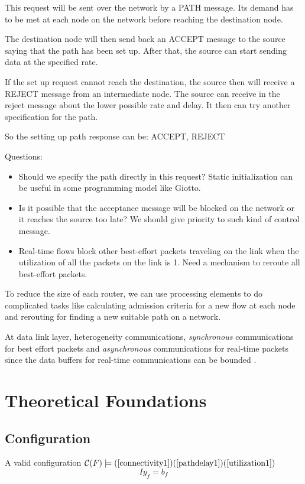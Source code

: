 \documentclass[10pt]{article}
\begin{document}
This request will be sent over the network by a PATH message. Its demand has 
to be met at each node on the network before reaching the destination node.

The destination node will then send back an ACCEPT message to the source saying 
that the path has been set up. After that, the source can start sending data at 
the specified rate.

If the set up request cannot reach the destination, the source then will receive 
a REJECT message from an intermediate node. The source can receive in the reject 
message about the lower possible rate and delay. It then can try another specification 
for the path.

So the setting up path response can be: ACCEPT, REJECT

Questions:
\begin{itemize}
\item Should we specify the path directly in this request? Static initialization 
can be useful in some programming model like Giotto.	
\item Is it possible that the acceptance message will be blocked on the network 
or it reaches the source too late? We should give priority to such kind of control
message.
\item Real-time flows block other best-effort packets traveling on the link when 
the utilization of all the packets on the link is 1. Need a mechanism to reroute 
all best-effort packets.
\end{itemize}

To reduce the size of each router, we can use processing elements to do 
complicated tasks like calculating admission criteria for a new flow at each node 
and rerouting for finding a new suitable path on a network.

At data link layer,  heterogeneity communications, {\em synchronous} communications 
for best effort packets and {\em asynchronous} communications for real-time packets 
since the data buffers for real-time communications can be bounded \cite{Ferrari90ascheme}.

\section{Theoretical Foundations}
\subsection{Configuration}
A valid configuration $\mathcal{C}(F) \models (\ref{connectivity1}) 
(\ref{pathdelay1}) (\ref{utilization1})$
\begin{equation}\label{connectivity1}
Iy_f=b_f
\end{equation}
\end{document}
